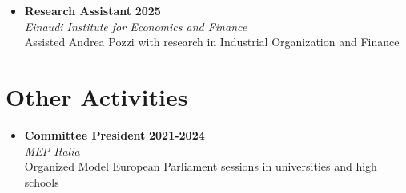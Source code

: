 \documentclass[11pt,a4paper]{article}
\newcommand{\cventry}[5]{%
    \item \textbf{#1} \hfill \textbf{#2} \\
    \textit{#3} \hfill #4 \\
    #5 %
}
\begin{document}
\begin{itemize}[leftmargin=0em, itemsep=0.5em]
	
    \cventry{Research Assistant}{2025}{Einaudi Institute for Economics and Finance}{}{
    	Assisted Andrea Pozzi with research in Industrial Organization and Finance
    }{}
\end{itemize}

\section{Other Activities}
\begin{itemize}[leftmargin=0em, itemsep=0.5em]
\cventry{Committee President}{2021-2024}{MEP Italia}{}{Organized Model European Parliament sessions in universities and high schools}
\end{itemize}
\end{document}

